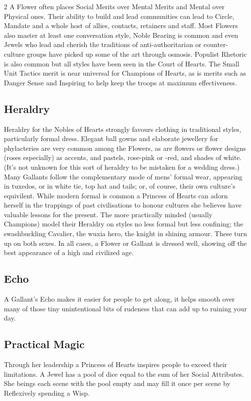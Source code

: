 \begin{multicols}{2}
A Flower often places Social Merits over Mental Merits and Mental over Physical ones. Their ability to build and lead communities can lead to Circle, Mandate and a whole host of allies, contacts, retainers and staff. Most Flowers also master at least one conversation style, Noble Bearing is common and even Jewels who lead and cherish the traditions of anti-authoritarian or counter-culture groups have picked up some of the art through osmosis. Populist Rhetoric is also common but all styles have been seen in the Court of Hearts. The Small Unit Tactics merit is near universal for Champions of Hearts, as is merits such as Danger Sense and Inspiring to help keep the troops at maximum effectiveness. 

\subsection*{Heraldry}

Heraldry for the Nobles of Hearts strongly favours clothing in traditional styles, particularly formal dress. Elegant ball gowns and elaborate jewellery for phylacteries are very common among the Flowers, as are flowers or flower designs (roses especially) as accents, and pastels, rose-pink or -red, and shades of white. (It's not unknown for this sort of heraldry to be mistaken for a wedding dress.) Many Gallants follow the complementary mode of mens' formal wear, appearing in tuxedos, or in white tie, top hat and tails; or, of course, their own culture's equivilent. While modern formal is common a Princess of Hearts can adorn herself in the trappings of past civilisations to honour cultures she believes have valuable lessons for the present. The more practically minded (usually Champions) model their Heraldry on styles no less formal but less confining; the swashbuckling Cavalier, the wuxia hero, the knight in shining armour. These turn up on both sexes. In all cases, a Flower or Gallant is dressed well, showing off the best appearance of a high and civilized age.

\subsection*{Echo}
A Gallant's Echo makes it easier for people to get along, it helps smooth over many of those tiny unintentional bits of rudeness that can add up to ruining your day.
\subsection*{Practical Magic}
Through her leadership a Princess of Hearts inspires people to exceed their limitations. A Jewel has a pool of dice equal to the sum of her Social Attributes. She beings each scene with the  pool empty and may fill it once per scene by Reflexively spending a Wisp.


\end{multicols}
